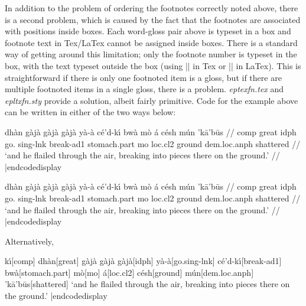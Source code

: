 In addition to the problem of ordering the footnotes correctly noted above,
there is a second problem, which is caused by the fact that the footnotes are
associated with positions inside boxes.  Each word-gloss pair above is typeset
in a box and footnote text in Tex/LaTex cannot be assigned inside boxes.
There is a standard way of getting around this limitation; only the footnote
number is typeset in the box, with the text typeset outside the box (using
|\vfootnote| in Tex or |\footnotetext| in LaTex).  This is straightforward if
there is only one footnoted item is a gloss, but if there are multiple
footnoted items in a single gloss, there is a problem.  {\sl eptexfn.tex\/} and
{\sl epltxfn.sty\/} provide a solution, albeit fairly primitive. Code for the
example above can be written in either of the two ways below:

\codedisplay
\ex
\begingl
{} dh\`an {g\`aj\`a g\`aj\`a g\`aj\`a} y\`a-\`a c\'e'd-k{\'\i}
bw\`a m\`o \'a c\'esh m\'un {'k\=a'b\=us} //
\glb
{\sc comp}  great  {\sc idph} go.  {\sc sing-lnk}  break-{\sc ad1}
stomach.{\sc part}  {\sc mo}  {\sc loc.cl2}  ground  {\sc dem.loc.anph}
shattered //
\glft `and he flailed through the air, breaking into pieces there on the
ground.' //
\endgl
\xe
{}
|endcodedisplay

\codedisplay
\ex
\begingl
{} dh\`an {g\`aj\`a g\`aj\`a g\`aj\`a} y\`a-\`a c\'e'd-k{\'\i}
bw\`a m\`o \'a c\'esh m\'un {'k\=a'b\=us} //
\glb
{\sc comp}  great  {\sc idph} go.  {\sc sing-lnk}  break-{\sc ad1}
stomach.{\sc part}  {\sc mo}  {\sc loc.cl2}  ground  {\sc dem.loc.anph}
shattered //
\glft `and he flailed through the air, breaking into pieces there on the
ground.' //
\endgl
\xe
{}
|endcodedisplay

\noindent Alternatively,

\codedisplay
\ex[glstyle=nlevel]
\begingl
{k\'\i}[\sc comp]
dh\`an[great]
{g\`aj\`a g\`aj\`a g\`aj\`a}[\sc idph]
y\`a-\`a[go.\sc sing-lnk]
c\'e'd-k{\'\i}[break-\sc ad1]
bw\`a[stomach.\sc part]
m\`o[\sc mo]
\'a[\sc loc.cl2]
c\'esh[ground]
m\'un[\sc dem.loc.anph]
'k\=a'b\=us[shattered]
\glft `and he flailed through the air, breaking into pieces there on the
ground.'
\endgl
{}
\xe
|endcodedisplay

